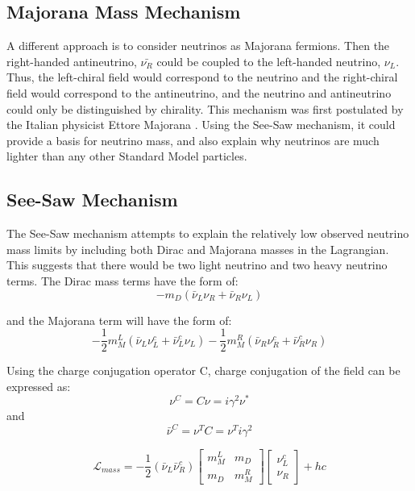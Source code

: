 \subsection{Majorana Mass Mechanism}
A different approach is to consider neutrinos as Majorana fermions. Then the right-handed antineutrino, $\bar{\nu_R}$ could be coupled to the left-handed neutrino, $\nu_L$. Thus, the left-chiral field would correspond to the neutrino and the right-chiral field would correspond to the antineutrino, and the neutrino and antineutrino could only be distinguished by chirality. This mechanism was first postulated by the Italian physicist Ettore Majorana \cite{Majorana_1937}. Using the See-Saw mechanism, it could provide a basis for neutrino mass, and also explain why neutrinos are much lighter than any other Standard Model particles.


\subsection{See-Saw Mechanism}
The See-Saw mechanism attempts to explain the relatively low observed neutrino mass limits by including both Dirac and Majorana masses in the Lagrangian. This suggests that there would be two light neutrino and two heavy neutrino terms. The Dirac mass terms have the form of:
\begin{equation}\label{dirac_mass_terms}
-m_D(\bar{\nu}_L\nu_R+\bar{\nu}_R\nu_L)
\end{equation}

and the Majorana term will have the form of:
\begin{equation}\label{majorana_mass_terms}
-\frac{1}{2}m^L_M(\bar{\nu}_L\nu_L^c+\bar{\nu}_L^c\nu_L)-\frac{1}{2}m^R_M(\bar{\nu}_R\nu_R^c+\bar{\nu}_R^c\nu_R)
\end{equation}

Using the charge conjugation operator C, charge conjugation of the field can be expressed as:
\begin{equation}\label{charge_conjugation1}
\nu^C=C\nu=i\gamma^2\nu^*
\end{equation}
and
\begin{equation}\label{charge_conjugation2}
\bar{\nu}^C=\nu^TC=\nu^Ti\gamma^2
\end{equation}

\begin{equation}\label{mass_lagrangian}
\mathcal{L}_{mass} = -\frac{1}{2}(\bar{\nu}_L\bar{\nu}_R^c) \begin{bmatrix} m_M^L & m_D \\ m_D & m_M^R \end{bmatrix} \begin{bmatrix} \nu_L^c \\ \nu_R \end{bmatrix} + hc
\end{equation}

